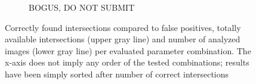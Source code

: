 \begin{figure}
\begin{subfigure}{\textwidth}
		\vspace{-20pt}
		\caption{BOGUS, DO NOT SUBMIT}
	\end{subfigure}
	\caption{Correctly found intersections compared to false positives, totally available intersections (upper gray line) and number of analyzed images (lower gray line) per evaluated parameter combination. The x-axis does not imply any order of the tested combinations; results have been simply sorted after number of correct intersections}
\end{figure}
